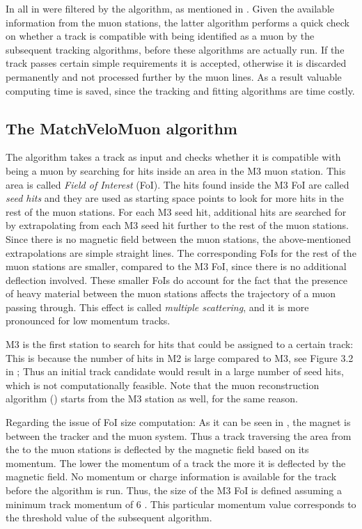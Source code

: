 In \runone all \veloTracks in \hltone were filtered by the \mvm algorithm, as mentioned in .
Given the available information from the muon stations, the latter algorithm performs a quick check on whether a
\velo track is compatible with being identified as a muon by the subsequent tracking algorithms, before these
algorithms are actually run. If the \velo track passes certain simple requirements it
is accepted, otherwise it is discarded permanently and not processed further by the \hlt muon lines. As a result
valuable computing time is saved, since the \FwD tracking and fitting algorithms are time costly.

\subsection{The MatchVeloMuon algorithm}
\label{sec:muon_matching}

The \mvm algorithm takes a \velo track as input and checks whether it is compatible with being a muon by
searching for hits inside an area in the M3 muon station. This area is called {\it Field of Interest} (FoI).
The hits found inside the M3 FoI are called {\it seed hits} and they are used as starting space points to look
for more hits in the rest of the muon stations. For each M3 seed hit, additional hits are searched for
by extrapolating from each M3 seed hit further to the rest of the muon stations.
Since there is no magnetic field between the muon stations, the above-mentioned extrapolations are simple straight lines.
The corresponding FoIs for the rest of the muon stations are smaller, compared to the M3 FoI, since there
is no additional deflection involved. These smaller FoIs do account for the fact that the presence of heavy material
between the muon stations affects the trajectory of a muon passing through. This effect is called {\it multiple
scattering}, and it is more pronounced for low momentum tracks.

M3 is the first station to search for hits that could be assigned to a certain \velo track: This is because the
number of hits in M2 is large compared to M3, see Figure 3.2 in \cite{roelThesis}; Thus an initial \velo track
candidate would result in a large number of seed hits, which is not computationally feasible. Note that the muon
reconstruction algorithm (\isMuon) starts from the M3 station as well, for the same reason.

Regarding the issue of FoI size computation: As it can be seen in ,
the \lhcb magnet is between the \velo tracker and the muon system. Thus a track traversing the area from the
\velo to the muon stations is deflected by the magnetic field based on its momentum.  The lower the momentum
of a track the more it is deflected by the magnetic field. No momentum or charge information is available for
the \velo track before the \FwD algorithm is run. Thus, the size of the M3 FoI is defined assuming a minimum
track momentum of 6 \gevc. This particular momentum value corresponds to the threshold value of the subsequent
\isMuon algorithm.


